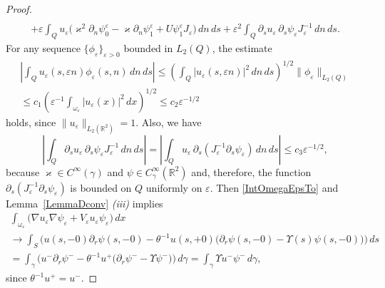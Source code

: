 \documentclass[reqno]{amsart}
\theoremstyle{plain}
\numberwithin{equation}{section}
\renewcommand{\kappa}{\varkappa}
\newcommand{\Real}{\mathbb R}
\newcommand{\eps}{\varepsilon}
\renewcommand{\leq}{\leqslant}
\begin{document}
\begin{proof}
\begin{multline}
     \\
     +\eps\int_Q u_\eps\big(\kappa^2\partial_n \psi_0^\eps-\kappa\partial_n \psi_1^\eps+U \psi_1^\eps J_\eps\big)\,dn\,ds
     +\eps^2\int_Q \partial_s u_\eps \,\partial_s \psi_\eps J_\eps^{-1} \,dn\,ds.
  \end{multline}
For any sequence $\{\phi_\eps\}_{\eps>0}$ bounded in $L_2(Q)$, the estimate
\begin{multline*}
  \left|\int_Q u_\eps(s,\eps n) \phi_\eps(s,n) \,dn\,ds\right|\leq
  \left(\int_Q |u_\eps(s,\eps n)|^2\,dn\,ds\right)^{1/2}\|\phi_\eps\|_{L_2(Q)}
  \\
  \leq c_1\left(\eps^{-1}\int_{\omega_\eps} |u_\eps(x)|^2\,dx\right)^{1/2}
  \leq c_2\eps^{-1/2}
\end{multline*}
holds, since $\|u_\eps\|_{L_2(\Real^2)}=1$. Also, we have
\begin{equation*}
 \left| \int_Q \partial_s u_\eps \,\partial_s \psi_\eps J_\eps^{-1} \,dn\,ds\right|=\left| \int_Q u_\eps \,\partial_s(J_\eps^{-1}\partial_s\psi_\eps ) \,dn\,ds\right|\leq c_3\eps^{-1/2},
\end{equation*}
because $\kappa \in C^\infty(\gamma)$ and $\psi\in C^\infty_\gamma (\Real^2)$ and, therefore, the function $\partial_s(J_\eps^{-1}\partial_s\psi_\eps )$ is bounded on $Q$ uniformly on $\eps$.
Then \eqref{IntOmegaEpsTo} and Lemma~\ref{LemmaDconv} \textit{(iii)} implies
\begin{multline*}
     \int_{\omega_\eps}\big(\nabla u_\eps \nabla \psi_\eps+  V_\eps u_\eps \psi_\eps\big)\,dx
     \\
     \to \int_S \Big(u(s,-0)\partial_r \psi(s,-0)-
    \theta^{-1}u(s,+0)\big(\partial_r\psi(s,-0)
    -\Upsilon(s)\psi(s,-0)\big)\Big)\,ds
     \\
     =\int_\gamma \Big(u^-\partial_r \psi^--
    \theta^{-1}u^+\big(\partial_r\psi^-
    -\Upsilon\psi^-\big)\Big)\,d\gamma=\int_\gamma\Upsilon u^-\psi^-\,d\gamma,
 \end{multline*}
since $\theta^{-1}u^+ = u^-$.
\end{proof}
\end{document}
